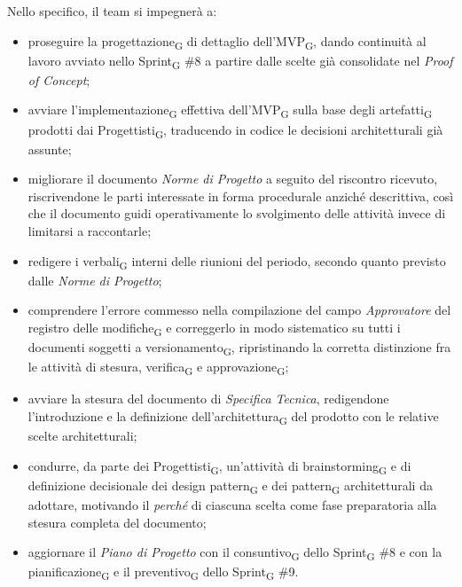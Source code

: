 ﻿\documentclass[a4paper, 10pt, colorlinks=true, linkcolor=black, urlcolor=blue, citecolor=blue, hidelinks]{article}
\begin{document}
Nello specifico, il team si impegnerà a:
\begin{itemize}
    \item proseguire la progettazione\textsubscript{G} di dettaglio dell'MVP\textsubscript{G}, dando continuità al lavoro avviato nello Sprint\textsubscript{G} \#8 a partire dalle scelte già consolidate nel \textit{Proof of Concept};

    \item avviare l'implementazione\textsubscript{G} effettiva dell'MVP\textsubscript{G} sulla base degli artefatti\textsubscript{G} prodotti dai Progettisti\textsubscript{G}, traducendo in codice le decisioni architetturali già assunte;

    \item migliorare il documento \textit{Norme di Progetto} a seguito del riscontro ricevuto, riscrivendone le parti interessate in forma procedurale anziché descrittiva, così che il documento guidi operativamente lo svolgimento delle attività invece di limitarsi a raccontarle;

    \item redigere i verbali\textsubscript{G} interni delle riunioni del periodo, secondo quanto previsto dalle \textit{Norme di Progetto};

    \item comprendere l'errore commesso nella compilazione del campo \textit{Approvatore} del registro delle modifiche\textsubscript{G} e correggerlo in modo sistematico su tutti i documenti soggetti a versionamento\textsubscript{G}, ripristinando la corretta distinzione fra le attività di stesura, verifica\textsubscript{G} e approvazione\textsubscript{G};

    \item avviare la stesura del documento di \textit{Specifica Tecnica}, redigendone l'introduzione e la definizione dell'architettura\textsubscript{G} del prodotto con le relative scelte architetturali;

    \item condurre, da parte dei Progettisti\textsubscript{G}, un'attività di brainstorming\textsubscript{G} e di definizione decisionale dei design pattern\textsubscript{G} e dei pattern\textsubscript{G} architetturali da adottare, motivando il \emph{perché} di ciascuna scelta come fase preparatoria alla stesura completa del documento;

    \item aggiornare il \textit{Piano di Progetto} con il consuntivo\textsubscript{G} dello Sprint\textsubscript{G} \#8 e con la pianificazione\textsubscript{G} e il preventivo\textsubscript{G} dello Sprint\textsubscript{G} \#9.
\end{itemize}
\end{document}
